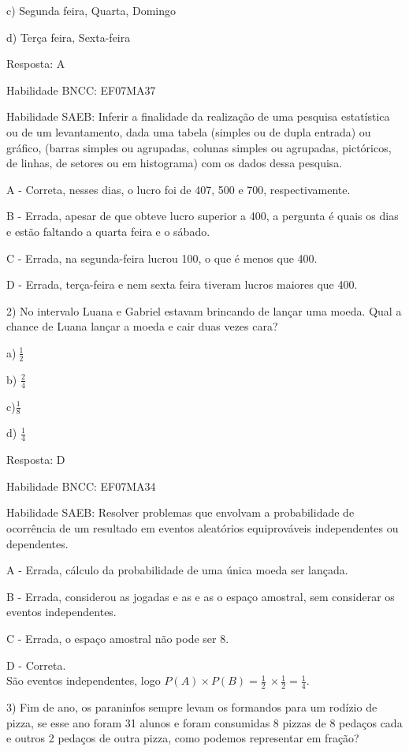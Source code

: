 {{{{{{{{{{{{{{{{c) Segunda feira, Quarta, Domingo

d) Terça feira, Sexta-feira

Resposta: A

Habilidade BNCC: EF07MA37

Habilidade SAEB: Inferir a finalidade da realização de uma pesquisa
estatística ou de um levantamento, dada uma tabela (simples ou de dupla
entrada) ou gráfico, (barras simples ou agrupadas, colunas simples ou
agrupadas, pictóricos, de linhas, de setores ou em histograma) com os
dados dessa pesquisa.~

A - Correta, nesses dias, o lucro foi de 407, 500 e 700,
respectivamente.

B - Errada, apesar de que obteve lucro superior a 400, a pergunta é
quais os dias e estão faltando a quarta feira e o sábado.

C - Errada, na segunda-feira lucrou 100, o que é menos que 400.

D - Errada, terça-feira e nem sexta feira tiveram lucros maiores que
400.

2) No intervalo Luana e Gabriel estavam brincando de lançar uma moeda.
Qual a chance de Luana lançar a moeda e cair duas vezes cara?

a)\(\ \frac{1}{2}\)

b) \(\frac{2}{4}\)

c)\(\frac{1}{8}\)

d) \(\frac{1}{4}\)

Resposta: D

Habilidade BNCC: EF07MA34

Habilidade SAEB: Resolver problemas que envolvam a probabilidade de
ocorrência de um resultado em eventos aleatórios equiprováveis
independentes ou dependentes.

A - Errada, cálculo da probabilidade de uma única moeda ser lançada.

B - Errada, considerou as jogadas e as e as o espaço amostral, sem
considerar os eventos independentes.

C - Errada, o espaço amostral não pode ser 8.

D - Correta.\\
São eventos independentes, logo
\(P\left( A \right) \times P\left( B \right) = \frac{1}{2}\  \times \frac{1}{2} = \frac{1}{4}\).

3) Fim de ano, os paraninfos sempre levam os formandos para um rodízio
de pizza, se esse ano foram 31 alunos e foram consumidas 8 pizzas de 8
pedaços cada e outros 2 pedaços de outra pizza, como podemos representar
em fração?

}}}}}}}}}}}}}}}}

